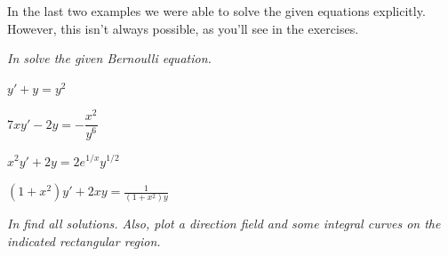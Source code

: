 In the last two examples we were able to solve the given equations
explicitly.   However, this isn't  always possible, as you'll
see in the exercises.


\exercises
\emph{In  solve the given Bernoulli
equation.}

\begin{exerciselistTwoColumn}

\item\label{exer:2.4.1}$y'+y=y^2$
\item\label{exer:2.4.2}$7xy'-2y=-\dfrac{x^2 }{y^6}$
\item\label{exer:2.4.3}$x^2y'+2y=2e^{1/x}y^{1/2}$
\item\label{exer:2.4.4}$(1+x^2)y'+2xy=\frac{1}{(1+x^2)y}$
\end{exerciselistTwoColumn}
%
\textsl{In  find all
solutions. Also, plot a direction field and some integral curves on
the indicated rectangular region.}


